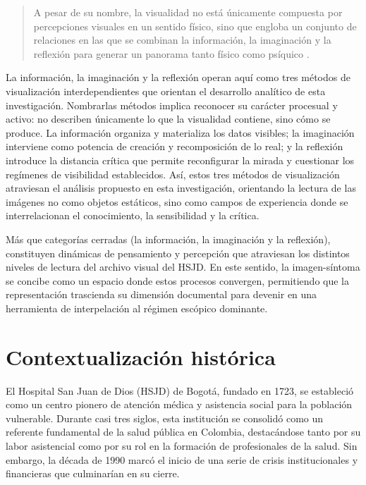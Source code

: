 \begin{quote}
\textcolor{edit30sept}{A pesar de su nombre, la visualidad no está únicamente compuesta por percepciones visuales en un sentido físico, sino que engloba un conjunto de relaciones en las que se combinan la información, la imaginación y la reflexión para generar un panorama tanto físico como psíquico \parencite{Mirzoeff2016}.}
\end{quote}


\textcolor{edit30sept}{La información, la imaginación y la reflexión operan aquí como tres métodos de visualización interdependientes que orientan el desarrollo analítico de esta investigación. Nombrarlas métodos implica reconocer su carácter procesual y activo: no describen únicamente lo que la visualidad contiene, sino cómo se produce. La información organiza y materializa los datos visibles; la imaginación interviene como potencia de creación y recomposición de lo real; y la reflexión introduce la distancia crítica que permite reconfigurar la mirada y cuestionar los regímenes de visibilidad establecidos. Así, estos tres métodos de visualización atraviesan el análisis propuesto en esta investigación, orientando la lectura de las imágenes no como objetos estáticos, sino como campos de experiencia donde se interrelacionan el conocimiento, la sensibilidad y la crítica.}

\textcolor{edit30sept}{Más que categorías cerradas (la información, la imaginación y la reflexión), constituyen dinámicas de pensamiento y percepción que atraviesan los distintos niveles de lectura del archivo visual del HSJD. En este sentido, la imagen-síntoma se concibe como un espacio donde estos procesos convergen, permitiendo que la representación trascienda su dimensión documental para devenir en una herramienta de interpelación al régimen escópico dominante.}


\section*{Contextualización histórica}

El Hospital San Juan de Dios (HSJD) de Bogotá, fundado en 1723, se estableció como un centro pionero de atención médica y asistencia social para la población vulnerable. Durante casi tres siglos, esta institución se consolidó como un referente fundamental de la salud pública en Colombia, destacándose tanto por su labor asistencial como por su rol en la formación de profesionales de la salud. Sin embargo, la década de 1990 marcó el inicio de una serie de crisis institucionales y financieras que culminarían en su cierre.

